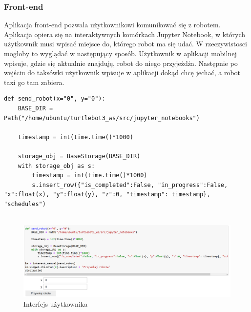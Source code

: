 \documentclass[12pt]{article}
\newcommand{\vsp}{\vspace{0.5cm}}
\begin{document}
\newpage
\subsubsection*{Front-end}

Aplikacja front-end pozwala użytkownikowi komunikować się z robotem. Aplikacja opiera się na interaktywnych komórkach Jupyter Notebook, w których użytkownik musi wpisać miejsce do, którego robot ma się udać. W rzeczywistosci mogłoby to wyglądać w następujący sposób. Użytkownik w aplikacji mobilnej wpisuje, gdzie się aktualnie znajduję, robot do niego przyjeżdża. Następnie po wejściu do taksówki użytkownik wpisuje w aplikacji dokąd chcę jechać, a robot taxi go tam zabiera.

\vsp\vsp

\begin{lstlisting}
def send_robot(x="0", y="0"):
    BASE_DIR = Path("/home/ubuntu/turtlebot3_ws/src/jupyter_notebooks")

    timestamp = int(time.time()*1000)

    storage_obj = BaseStorage(BASE_DIR)
    with storage_obj as s:
        timestamp = int(time.time()*1000)
        s.insert_row({"is_completed":False, "in_progress":False, "x":float(x), "y":float(y), "z":0, "timestamp": timestamp}, "schedules")
    
\end{lstlisting}
    
\vsp\vsp

\begin{figure}[!htb]
    \centering
    \includegraphics[width=18cm]{./images/interact.png}
    \caption{Interfejs użytkownika}
\end{figure}
\end{document}
